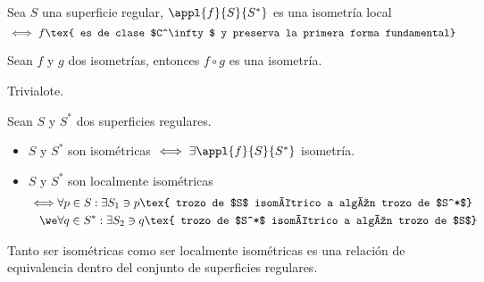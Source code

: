 \begin{defn}
	Sea $S$ una superficie regular, $\appl{f}{S}{S^*}$ es una isometría local
	\[\iff f\tex{ es de clase $C^\infty$ y preserva la primera forma fundamental}\]
\end{defn}

\begin{lem}
	Sean $f$ y $g$ dos isometrías, entonces $f\circ g$ es una isometría.
	\begin{dem}
		Trivialote.
	\end{dem}
\end{lem}

\begin{defn}Sean $S$ y $S^*$ dos superficies regulares.
	\begin{itemize}
		\item $S$ y $S^*$ son isométricas $\iff \exists \appl{f}{S}{S^*}$ isometría.
		\item $S$ y $S^*$ son localmente isométricas
		      \[\begin{aligned}
				      \iff & \forall p \in S : \exists S_1 \ni p \tex{ trozo de $S$ isométrico a algún trozo de $S^*$}   \\
				      \we  & \forall q \in S^* : \exists S_2 \ni q \tex{ trozo de $S^*$ isométrico a algún trozo de $S$}
			      \end{aligned}\]
	\end{itemize}
\end{defn}

\begin{obs}
	Tanto ser isométricas como ser localmente isométricas es una relación de equivalencia dentro del conjunto de superficies regulares.
\end{obs}

